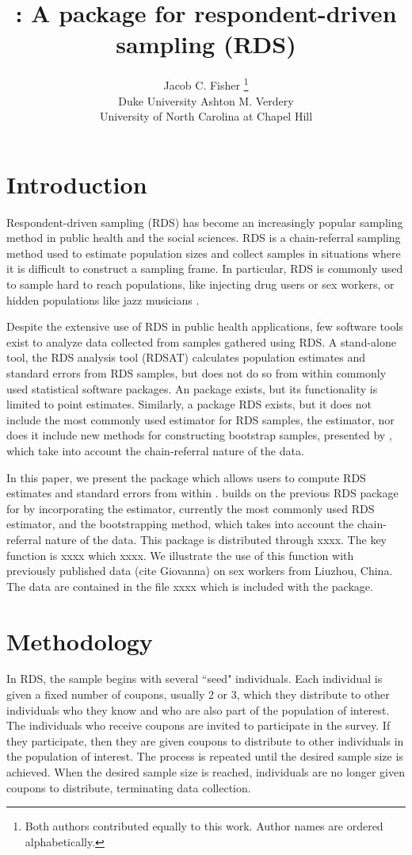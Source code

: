 \documentclass[article, shortnames]{jss}
\author{Jacob C. Fisher
        \thanks{Both authors contributed equally to this work.  Author names are ordered alphabetically.}
	       \\Duke University \And 
        Ashton M. Verdery\\University of North Carolina at Chapel Hill
								}
\title{\pkg{RDS2}: A \proglang{Stata} package for respondent-driven sampling (RDS)}
\begin{document}

\section[Introduction]{Introduction}
Respondent-driven sampling (RDS) has become an increasingly popular sampling method in public health and the social sciences. RDS is a chain-referral sampling method used to estimate population sizes and collect samples in situations where it is difficult to construct a sampling frame.  In particular, RDS is commonly used to sample hard to reach populations, like injecting drug users or sex workers, or hidden populations like jazz musicians \citep{heckathorn97}.

Despite the extensive use of RDS in public health applications, few software tools exist to analyze data collected from samples gathered using RDS.  A stand-alone tool, the RDS analysis tool (RDSAT) \citep{rdsat} calculates population estimates and standard errors from RDS samples, but does not do so from within commonly used statistical software packages.  An  package  \citep{r-rds} exists, but its functionality is limited to point estimates.  Similarly, a  package RDS \citep{stata-rds} exists, but it does not include the most commonly used estimator for RDS samples, the \citet{vh2008} estimator, nor does it include new methods for constructing bootstrap samples, presented by \citet{salganik2006}, which take into account the chain-referral nature of the data.

In this paper, we present the  package  which allows users to compute RDS estimates and standard errors from within .   builds on the previous RDS package for  by incorporating the \citet{vh2008} estimator, currently the most commonly used RDS estimator, and the \citet{salganik2006} bootstrapping method, which takes into account the chain-referral nature of the data.  This package is distributed through xxxx.  The key function is xxxx which xxxx.  We illustrate the use of this function with previously published data (cite Giovanna) on sex workers from Liuzhou, China.  The data are contained in the file xxxx which is included with the  package.

\section[Methodology]{Methodology}
In RDS, the sample begins with several ``seed" individuals.  Each individual is given a fixed number of coupons, usually 2 or 3, which they distribute to other individuals who they know and who are also part of the population of interest.  The individuals who receive coupons are invited to participate in the survey.  If they participate, then they are given coupons to distribute to other individuals in the population of interest.  The process is repeated until the desired sample size is achieved.  When the desired sample size is reached, individuals are no longer given coupons to distribute, terminating data collection.   




\end{document}
